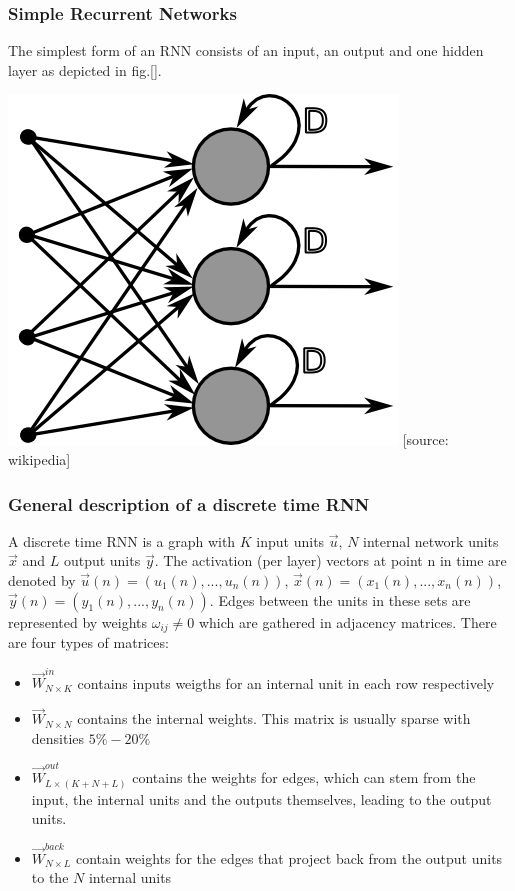 \subsubsection*{Simple Recurrent Networks}
The simplest form of an RNN consists of an input, an output and one hidden layer as depicted in fig.[]. 

\includegraphics[width=.7\textwidth]{./img/simple_rnn.png}
[source: wikipedia]

\subsubsection*{General description of a discrete time RNN}
A discrete time RNN is a graph with $K$ input units $\vec{u}$, $N$ internal network units $\vec{x}$ and $L$ output units $\vec{y}$. The activation (per layer) vectors at point n in time are denoted by $\vec{u}(n) = (u_1(n),...,u_n(n))$, $\vec{x}(n) = (x_1(n),...,x_n(n))$, $\vec{y}(n) = (y_1(n),...,y_n(n))$. Edges between the units in these sets are represented by weights $\omega_{ij}\neq0$ which are gathered in adjacency matrices. There are four types of matrices:\par
\begin{itemize}
	\item $\vec{W}^{in}_{N\times K}$ contains inputs weigths for an internal unit in each row respectively 
	\item $\vec{W}_{N\times N}$ contains the internal weights. This matrix is usually sparse with densities $5\%-20\%$
	\item $\vec{W}^{out}_{L\times (K+N+L)}$ contains the weights for edges, which can stem from the input, the internal units and the outputs themselves, leading to the output units.
	\item $\vec{W}^{back}_{N\times L}$ contain weights for the edges that project back from the output units to the $N$ internal units
\end{itemize}


